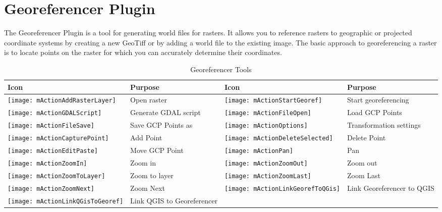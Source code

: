 
\section{Georeferencer Plugin}


The Georeferencer Plugin is a tool for generating world files for rasters.
It allows you to reference rasters to geographic or projected coordinate 
systems by creating a new GeoTiff or by adding a world file to the 
existing image. The basic approach to georeferencing a raster is to locate 
points on the raster for which you can accurately determine their coordinates. 


\begin{table}[h]
\centering\small
\renewcommand{\arraystretch}{2}
 \begin{tabular}{|m{1cm}|m{5.4cm}|m{1cm}|m{5.4cm}|}
 \hline \textbf{Icon} & \textbf{Purpose} & \textbf{Icon} &
 \textbf{Purpose} \\
 \hline \texttt{[image: mActionAddRasterLayer]} & Open raster &
 \texttt{[image: mActionStartGeoref]} & Start georeferencing \\
 \hline \texttt{[image: mActionGDALScript]} & Generate GDAL script &
 \texttt{[image: mActionFileOpen]} & Load GCP Points \\
 \hline \texttt{[image: mActionFileSave]} & Save GCP Points as &
 \texttt{[image: mActionOptions]} & Transformation settings \\
 \hline \texttt{[image: mActionCapturePoint]} & Add Point &
 \texttt{[image: mActionDeleteSelected]} & Delete Point \\
 \hline \texttt{[image: mActionEditPaste]} & Move GCP Point &
 \texttt{[image: mActionPan]} & Pan \\
 \hline \texttt{[image: mActionZoomIn]} & Zoom in &
 \texttt{[image: mActionZoomOut]} & Zoom out \\
 \hline \texttt{[image: mActionZoomToLayer]} & Zoom to layer &
 \texttt{[image: mActionZoomLast]} & Zoom Last \\
 \hline \texttt{[image: mActionZoomNext]} & Zoom Next &
 \texttt{[image: mActionLinkGeorefToQGis]} & Link Georeferencer to QGIS \\
 \hline \texttt{[image: mActionLinkQGisToGeoref]} & Link QGIS to Georeferencer &
 &  \\
\hline
\end{tabular}
\caption{Georeferencer Tools}\label{tab:georeferencer_tools}
\end{table}


